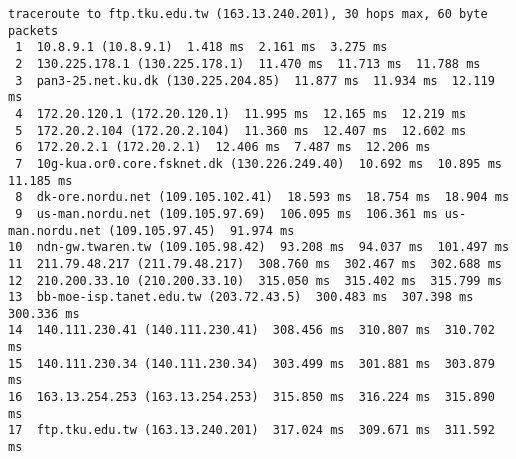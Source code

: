 \documentclass{acm_proc_article-sp}
\begin{document}
\begin{lstlisting}
traceroute to ftp.tku.edu.tw (163.13.240.201), 30 hops max, 60 byte packets
 1  10.8.9.1 (10.8.9.1)  1.418 ms  2.161 ms  3.275 ms
 2  130.225.178.1 (130.225.178.1)  11.470 ms  11.713 ms  11.788 ms
 3  pan3-25.net.ku.dk (130.225.204.85)  11.877 ms  11.934 ms  12.119 ms
 4  172.20.120.1 (172.20.120.1)  11.995 ms  12.165 ms  12.219 ms
 5  172.20.2.104 (172.20.2.104)  11.360 ms  12.407 ms  12.602 ms
 6  172.20.2.1 (172.20.2.1)  12.406 ms  7.487 ms  12.206 ms
 7  10g-kua.or0.core.fsknet.dk (130.226.249.40)  10.692 ms  10.895 ms  11.185 ms
 8  dk-ore.nordu.net (109.105.102.41)  18.593 ms  18.754 ms  18.904 ms
 9  us-man.nordu.net (109.105.97.69)  106.095 ms  106.361 ms us-man.nordu.net (109.105.97.45)  91.974 ms
10  ndn-gw.twaren.tw (109.105.98.42)  93.208 ms  94.037 ms  101.497 ms
11  211.79.48.217 (211.79.48.217)  308.760 ms  302.467 ms  302.688 ms
12  210.200.33.10 (210.200.33.10)  315.050 ms  315.402 ms  315.799 ms
13  bb-moe-isp.tanet.edu.tw (203.72.43.5)  300.483 ms  307.398 ms  300.336 ms
14  140.111.230.41 (140.111.230.41)  308.456 ms  310.807 ms  310.702 ms
15  140.111.230.34 (140.111.230.34)  303.499 ms  301.881 ms  303.879 ms
16  163.13.254.253 (163.13.254.253)  315.850 ms  316.224 ms  315.890 ms
17  ftp.tku.edu.tw (163.13.240.201)  317.024 ms  309.671 ms  311.592 ms
\end{lstlisting}
\end{document}
